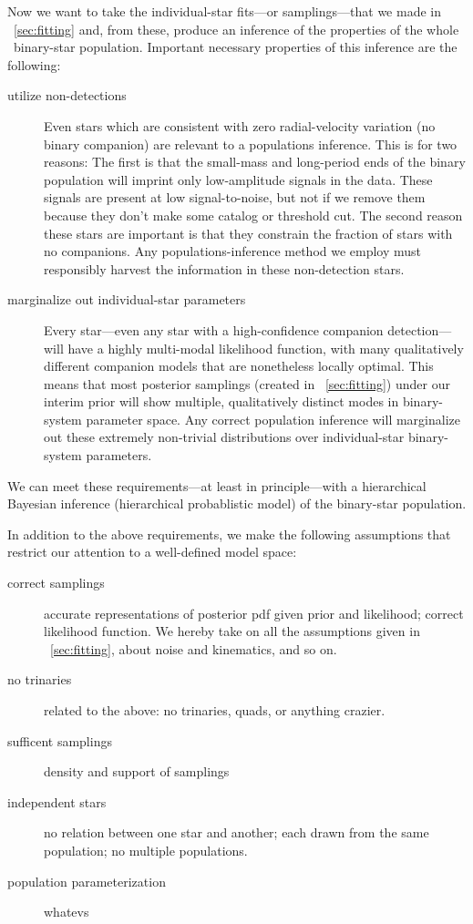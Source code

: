 \documentclass[modern, letterpaper]{aastex61}
\newcommand{\RC}{\acronym{RC}}
\begin{document}
Now we want to take the individual-star fits---or samplings---that
we made in \sectionname~\ref{sec:fitting} and, from these, produce
an inference of the properties of the whole \RC\ binary-star population.
Important necessary properties of this inference are the following:
\begin{description}
\item[utilize non-detections] Even stars which are consistent with
  zero radial-velocity variation (no binary companion) are relevant to
  a populations inference. This is for two reasons: The first is that
  the small-mass and long-period ends of the binary population will
  imprint only low-amplitude signals in the data. These signals are
  present at low signal-to-noise, but not if we remove them because
  they don't make some catalog or threshold cut. The second reason
  these stars are important is that they constrain the fraction of
  stars with no companions. Any populations-inference method we employ
  must responsibly harvest the information in these non-detection
  stars.
\item[marginalize out individual-star parameters] Every star---even
  any star with a high-confidence companion detection---will have a
  highly multi-modal likelihood function, with many qualitatively
  different companion models that are nonetheless locally
  optimal. This means that most posterior samplings (created in
  \sectionname~\ref{sec:fitting}) under our interim prior will show
  multiple, qualitatively distinct modes in binary-system parameter
  space.  Any correct population inference will marginalize out these
  extremely non-trivial distributions over individual-star
  binary-system parameters.
\end{description}
We can meet these requirements---at least in principle---with a
hierarchical Bayesian inference (hierarchical probablistic model) of
the binary-star population.

In addition to the above requirements, we make the following assumptions
that restrict our attention to a well-defined model space:
\begin{description}
\item[correct samplings] accurate representations of posterior pdf
  given prior and likelihood; correct likelihood function. We hereby
  take on all the assumptions given in \sectionname~\ref{sec:fitting},
  about noise and kinematics, and so on.
\item[no trinaries] related to the above: no trinaries, quads, or anything
  crazier.
\item[sufficent samplings] density and support of samplings
\item[independent stars] no relation between one star and another; each
  drawn from the same population; no multiple populations.
\item[population parameterization] whatevs
\end{description}
\end{document}
